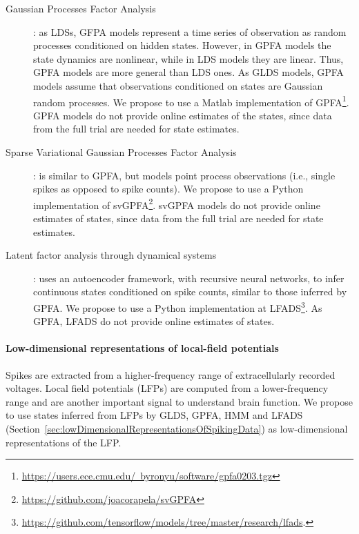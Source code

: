 \begin{description}
    \item[Gaussian Processes Factor Analysis]\citep[GPFA;][]{yuEtAl09}: as
        LDSs, GFPA models represent a time series of observation as random
        processes conditioned on hidden states. However, in GPFA models the
        state dynamics are nonlinear, while in LDS models they are linear.
        Thus, GPFA models are more general than LDS ones. As GLDS models, GPFA
        models assume that observations conditioned on states are Gaussian
        random processes. We propose to use a Matlab implementation of
        GPFA\footnote{\href{https://users.ece.cmu.edu/~byronyu/software/gpfa0203.tgz}{https://users.ece.cmu.edu/~byronyu/software/gpfa0203.tgz}}.
        GPFA models do not provide online estimates of the states, since data
        from the full trial are needed for state estimates.

    \item[Sparse Variational Gaussian Processes Factor
        Analysis]\citep[svGPFA;][]{dunckerAndSahani18}: is similar to GPFA, but
        models point process observations (i.e., single spikes as opposed to
        spike counts). We propose to use a Python implementation of
        svGPFA\footnote{\href{https://github.com/joacorapela/svGPFA}{https://github.com/joacorapela/svGPFA}}.
        svGPFA models do not provide online estimates of states, since data
        from the full trial are needed for state estimates.

    \item[Latent factor analysis through dynamical
        systems]\citep[LFADS;][]{pandarinathEtAl18}: uses an autoencoder
        framework, with recursive neural networks, to infer continuous states
        conditioned on spike counts, similar to those inferred by GPFA. We
        propose to use a Python implementation at
        LFADS\footnote{\href{https://github.com/tensorflow/models/tree/master/research/lfads}{https://github.com/tensorflow/models/tree/master/research/lfads}.}.
        As GPFA, LFADS do not provide online estimates of states.

\end{description}

\paragraph{Low-dimensional representations of local-field potentials}

Spikes are extracted from a higher-frequency range of extracellularly recorded
voltages. Local field potentials (LFPs) are computed from a lower-frequency
range and are another important signal to understand brain function. We propose
to use states inferred from LFPs by GLDS, GPFA, HMM and LFADS
(Section~\ref{sec:lowDimensionalRepresentationsOfSpikingData}) as
low-dimensional representations of the LFP.

